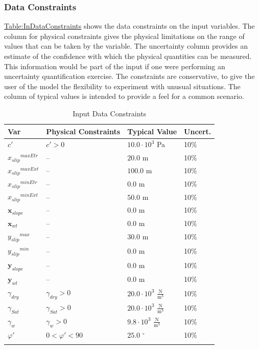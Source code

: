 \documentclass[12pt]{article}
\begin{document}
\subsubsection{Data Constraints}
\label{Sec:DataConstraints}
\hyperref[Table:InDataConstraints]{Table:InDataConstraints} shows the data constraints on the input variables. The column for physical constraints gives the physical limitations on the range of values that can be taken by the variable. The uncertainty column provides an estimate of the confidence with which the physical quantities can be measured. This information would be part of the input if one were performing an uncertainty quantification exercise. The constraints are conservative, to give the user of the model the flexibility to experiment with unusual situations. The column of typical values is intended to provide a feel for a common scenario.
\begin{longtable}{l l l l}
\toprule
\textbf{Var} & \textbf{Physical Constraints} & \textbf{Typical Value} & \textbf{Uncert.}
\\
\midrule
\endhead
$c'$ & $c'>0$ & $10.0\cdot{}10^{3}$ Pa & 10$\%$
\\
${{x_{slip}}^{maxEtr}}$ & -- & $20.0$ m & 10$\%$
\\
${{x_{slip}}^{maxExt}}$ & -- & $100.0$ m & 10$\%$
\\
${{x_{slip}}^{minEtr}}$ & -- & $0.0$ m & 10$\%$
\\
${{x_{slip}}^{minExt}}$ & -- & $50.0$ m & 10$\%$
\\
${\mathbf{x}_{slope}}$ & -- & $0.0$ m & 10$\%$
\\
${\mathbf{x}_{wt}}$ & -- & $0.0$ m & 10$\%$
\\
${{y_{slip}}^{max}}$ & -- & $30.0$ m & 10$\%$
\\
${{y_{slip}}^{min}}$ & -- & $0.0$ m & 10$\%$
\\
${\mathbf{y}_{slope}}$ & -- & $0.0$ m & 10$\%$
\\
${\mathbf{y}_{wt}}$ & -- & $0.0$ m & 10$\%$
\\
${γ_{dry}}$ & ${γ_{dry}}>0$ & $20.0\cdot{}10^{3}$ $\frac{\text{N}}{\text{m}^{3}}$ & 10$\%$
\\
${γ_{Sat}}$ & ${γ_{Sat}}>0$ & $20.0\cdot{}10^{3}$ $\frac{\text{N}}{\text{m}^{3}}$ & 10$\%$
\\
${γ_{w}}$ & ${γ_{w}}>0$ & $9.8\cdot{}10^{3}$ $\frac{\text{N}}{\text{m}^{3}}$ & 10$\%$
\\
$φ'$ & $0<φ'<90$ & $25.0$ ${}^{\circ}$ & 10$\%$
\\
\bottomrule
\caption{Input Data Constraints}
\label{Table:InDataConstraints}
\end{longtable}
\end{document}
